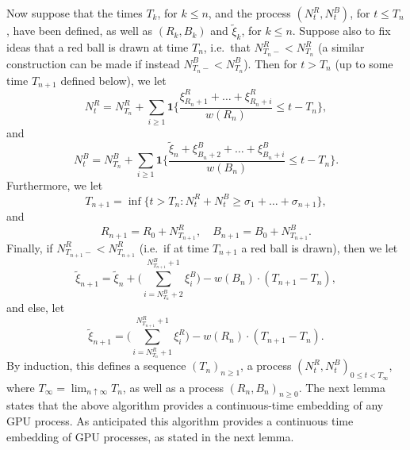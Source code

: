 \documentclass[11pt]{article}
\newcommand{\1}{{\text{\Large $\mathfrak 1$}}}
\begin{document}
\vspace{0.2cm}
Now suppose that the times $T_k$, for $k\le n$, and the process $(N_t^R,N_t^B)$, for $t\le T_n$, have been defined, as well as $(R_k,B_k)$ and $\widetilde \xi_k$, for $k\le n$. Suppose also to fix ideas that a red ball is drawn at time $T_n$, i.e.~that $N_{T_n-}^R<N_{T_n}^R$ (a similar construction can be made if instead $N_{T_n-}^B<N_{T_n}^B$). Then for $t>T_n$ (up to some time $T_{n+1}$ defined below), we let 
$$N_t^R = N_{T_n}^R +  \sum_{i\ge 1} \mathbf 1\Big\{\frac{\xi_{R_n+1}^R + \dots + \xi_{R_n+i}^R}{w(R_n)} \le t-T_n \Big\}, $$
and
$$N_t^B = N_{T_n}^B +  \sum_{i\ge 1} \mathbf 1\Big\{\frac{\widetilde \xi_n + \xi_{B_n+2}^B+ \dots + \xi_{B_n+i}^B}{w(B_n)} \le t-T_n\Big\}.$$
Furthermore, we let 
$$T_{n+1} = \inf \{t> T_n : N_t^R + N_t^B \ge \sigma_1+\dots+ \sigma_{n+1}\},$$ 
and 
$$R_{n+1} = R_0+ N_{T_{n+1}}^R, \quad B_{n+1} = B_0 + N_{T_{n+1}}^B.$$ 
Finally, if $N_{T_{n+1}-}^R< N_{T_{n+1}}^R$ (i.e.~if at time $T_{n+1}$ a red ball is drawn), then we let 
$$\widetilde \xi_{n+1}= \widetilde \xi_n + \Big(\sum_{i= N_{T_n}^B+2}^{N_{T_{n+1}}^B +1} \xi_i^B\Big)- w(B_n)\cdot (T_{n+1} - T_n),$$ 
and else, let 
$$ \widetilde \xi_{n+1}= \Big(\sum_{i= N_{T_n}^R+1}^{N_{T_{n+1}}^R +1} \xi_i^R\Big)- w(R_n)\cdot (T_{n+1} - T_n).$$ 
By induction, this defines a sequence $(T_n)_{n\ge 1}$, a process $(N_t^R,N_t^B)_{0\le t< T_\infty}$, where $T_\infty = \lim_{n\uparrow \infty} T_n$, as well as a process $(R_n,B_n)_{n\ge 0}$. 
The next lemma states that the above algorithm provides a continuous-time embedding of any GPU process. As anticipated this algorithm provides a continuous time embedding of GPU processes, as stated in the next lemma.  
\end{document}
